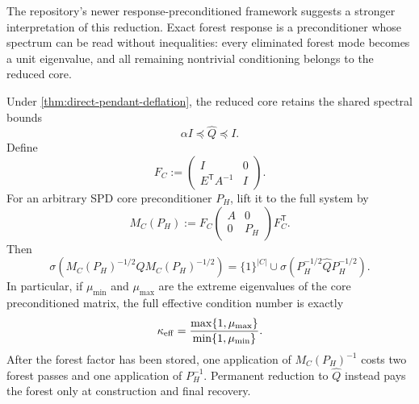 The repository's newer response-preconditioned framework suggests a stronger
interpretation of this reduction.  Exact forest response is a preconditioner
whose spectrum can be read without inequalities: every eliminated forest mode
becomes a unit eigenvalue, and all remaining nontrivial conditioning belongs
to the reduced core.

\begin{proposition}
\label{prop:direct-forest-spectral-lift}
Under \cref{thm:direct-pendant-deflation}, the reduced core retains the shared
spectral bounds
\begin{equation}
 \alpha I\preceq\widehat Q\preceq I.
 \label{eq:direct-forest-schur-bounds}
\end{equation}
Define
\begin{equation}
 F_C:=\begin{pmatrix}I&0\\E^\mathsf TA^{-1}&I\end{pmatrix}.
 \label{eq:direct-forest-response-factor}
\end{equation}
For an arbitrary SPD core preconditioner $P_H$, lift it to the full system by
\begin{equation}
 M_C(P_H):=
 F_C\begin{pmatrix}A&0\\0&P_H\end{pmatrix}F_C^\mathsf T.
 \label{eq:direct-forest-lifted-preconditioner}
\end{equation}
Then
\begin{equation}
 \sigma\!\left(M_C(P_H)^{-1/2}QM_C(P_H)^{-1/2}\right)
 =\{1\}^{|C|}\cup
 \sigma\!\left(P_H^{-1/2}\widehat QP_H^{-1/2}\right).
 \label{eq:direct-forest-lifted-spectrum}
\end{equation}
In particular, if
$\mu_{\min}$ and $\mu_{\max}$ are the extreme eigenvalues of the core
preconditioned matrix, the full effective condition number is exactly
\begin{equation}
 \kappa_{\rm eff}
 =\frac{\max\{1,\mu_{\max}\}}{\min\{1,\mu_{\min}\}}.
 \label{eq:direct-forest-lifted-condition}
\end{equation}
After the forest factor has been stored, one application of
$M_C(P_H)^{-1}$ costs two forest passes and one application of $P_H^{-1}$.
Permanent reduction to $\widehat Q$ instead pays the forest only at
construction and final recovery.
\end{proposition}

